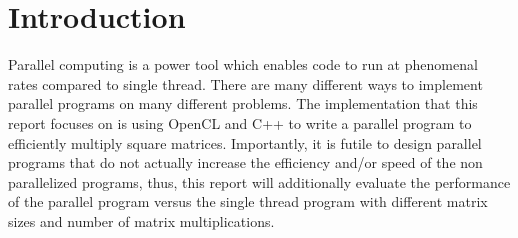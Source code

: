 \section{Introduction}
Parallel computing is a power tool which enables code to run at phenomenal rates compared to single thread.
There are many different ways to implement parallel programs on many different problems.
The implementation that this report focuses on is using OpenCL and C++ to write a parallel program to efficiently multiply square matrices.
Importantly, it is futile to design parallel programs that do not actually increase the efficiency and/or speed of the non parallelized programs, thus, this report will additionally evaluate the performance of the parallel program versus the single thread program with different matrix sizes and number of matrix multiplications.
